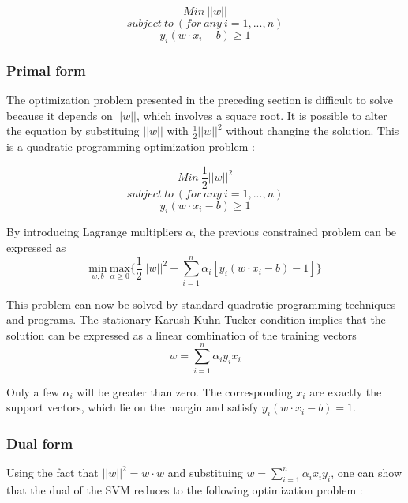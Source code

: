\[Min\ ||w||\]
\[subject\ to\ ( for\ any\ i=1,...,n )\] 
\[y_{i}(w \cdot x_{i} - b)\geq 1\]

\subsubsection{Primal form}

The optimization problem presented in the preceding section is difficult to solve because it depends on \begin{math}||w||\end{math}, which involves a square root. It is possible to alter the equation by substituing \begin{math}||w||\end{math} with \begin{math}\frac{1}{2}||w||^{2}\end{math}
without changing the solution. This is a quadratic programming optimization problem :

\[Min\ \frac{1}{2}||w||^{2}\]
\[subject\ to\ ( for\ any\ i=1,...,n )\]
\[y_{i}(w \cdot x_{i} - b)\geq 1\]

By introducing Lagrange multipliers $\alpha$, the previous constrained problem can be expressed as \[\underset{w,b}{\text{min}}\ \underset{\alpha \geq 0}{\text{max}}\{\frac{1}{2}||w||^{2}-\sum_{i=1}^n \alpha_{i}[y_{i}(w \cdot x_{i} - b)-1]\}\]

This problem can now be solved by standard quadratic programming techniques and programs. The stationary Karush-Kuhn-Tucker condition implies that the solution can be expressed as a linear combination of the training vectors \[w = \sum_{i=1}^n \alpha_i y_i x_i\] 

Only a few $\alpha_i$ will be greater than zero. The corresponding $x_i$ are exactly the support vectors, which lie on the margin and satisfy \begin{math}y_i (w\cdot x_i -b)=1\end{math}.

\subsubsection{Dual form}

Using the fact that \begin{math}||w||^2 = w \cdot w \end{math} and substituing \begin{math} w = \sum_{i=1}^n \alpha_i x_i y_i \end{math}, one can show that the dual of the SVM reduces to the following
optimization problem :


